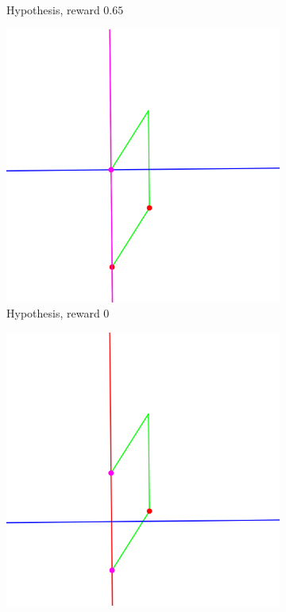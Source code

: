 \begin{figure}[!htb]
\begin{subfigure}[t]{0.32\textwidth}
         \caption{Hypothesis, reward $0.65$}
         \label{fig:hypotheses_explorer_hypothesis3}
     \end{subfigure}
     \hfill
     \begin{subfigure}[t]{0.32\textwidth}
         \centering
         \includegraphics[width=\textwidth]{img/hypothesis_explorer/source_01_score_0_999_Perp.png}
         \caption{Hypothesis, reward $0$}
         \label{fig:hypotheses_explorer_hypothesis1}
     \end{subfigure}
     \hfill
     \begin{subfigure}[t]{0.32\textwidth}
         \centering
         \includegraphics[width=\textwidth]{img/hypothesis_explorer/source_05_score_0_996_PerpBisector.png}

\end{subfigure}
\end{figure}
